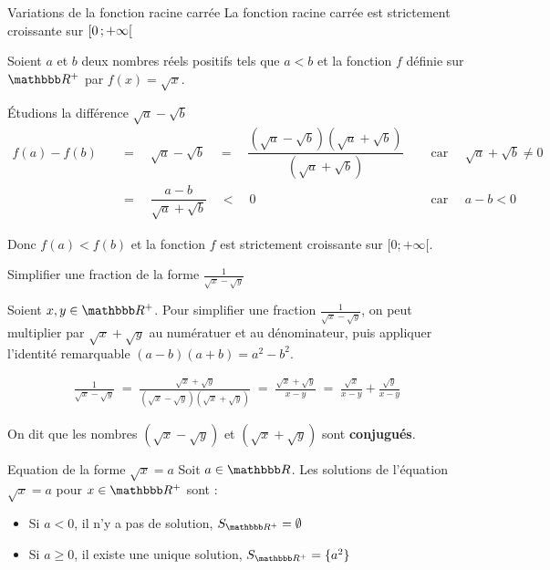 \documentclass[10pt,a4paper,openany,twoside]{book}
\begin{document}
	\begin{prop}{Variations de la fonction racine carrée}{}
	La fonction racine carrée est strictement croissante sur $\mathopen{[}0\mathclose{}\mathpunct{};+\infty\mathclose{[}$
	\end{prop}

	\begin{deme}{}{}
	\noindent Soient $a$ et $b$ deux nombres réels positifs tels que $a<b$ et la fonction $f$ définie sur $\R^+$ par $f(x)=\sqrt{x}$.

	\medskip
	\noindent Étudions la différence $\sqrt{a}-\sqrt{b}$
	\begin{align*}
		f(a)- f(b) \quad
		&= \quad \sqrt{a}-\sqrt{b} \quad = \quad \dfrac{\left(\sqrt{a}-\sqrt{b}\right)\left(\sqrt{a}+\sqrt{b}\right)}{\left(\sqrt{a}+\sqrt{b}\right)} \quad &\text{ car } \quad \sqrt{a}+\sqrt{b} \ne 0 \\
		&= \quad \dfrac{a-b}{\sqrt{a}+\sqrt{b}} \quad < \quad 0  &\text{ car } \quad a-b <0
	\end{align*}

	\noindent Donc $f(a)< f(b)$ et la fonction $f$ est strictement croissante sur $[0;+\infty[$.
	\end{deme}

	\begin{methode}{Simplifier une fraction de la forme $\frac{1}{\sqrt{x}-\sqrt{y}}$}{}

		Soient $x, y \in \R^{+}$. Pour simplifier une fraction $\frac{1}{\sqrt{x}-\sqrt{y}}$, on peut multiplier par $\sqrt{x}+\sqrt{y}$ au numératuer et au dénominateur, puis appliquer l'identité remarquable $(a-b)(a+b)=a^2-b^2$.

		\begin{align*}
			\frac{1}{\sqrt{x}-\sqrt{y}}
			\; = \; \frac{\sqrt{x}+\sqrt{y}}{(\sqrt{x}-\sqrt{y})(\sqrt{x}+\sqrt{y})}
			\; = \; \frac{\sqrt{x}+\sqrt{y}}{x-y}
			\; = \; \frac{\sqrt{x}}{x-y}+\frac{\sqrt{y}}{x-y}
		\end{align*}

		On dit que les nombres $(\sqrt{x}-\sqrt{y})$ et $(\sqrt{x}+\sqrt{y})$ sont \textbf{conjugués}.
	\end{methode}

	\begin{prop}{Equation de la forme $\sqrt{x}=a$}{}
		Soit $a\in\R$. Les solutions de l'équation $\sqrt{x}=a$ pour $x\in\R^+$ sont :
		\begin{itemize}
			\item Si $a<0$, il n'y a pas de solution, $S_{\R^+}  = \emptyset$
			\item Si $a \ge 0$, il existe une unique solution, $S_{\R^+} = \{ a^2 \}$
		\end{itemize}
	\end{prop}
\end{document}
